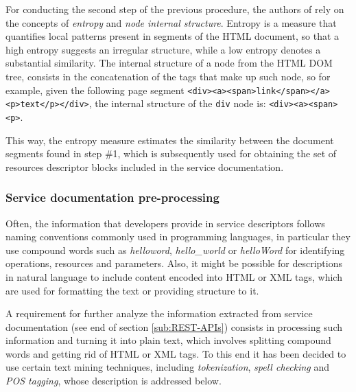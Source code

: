 For conducting the second step of the previous procedure, the authors of \cite{Ly:2012} rely on the concepts of \emph{entropy} and \emph{node internal structure}. Entropy is a measure that quantifies local patterns present in segments of the HTML document, so that a high entropy suggests
an irregular structure, while a low entropy denotes a substantial similarity. The internal structure of a node from the HTML DOM tree, consists in the concatenation of the tags that make up such node, so for example, given the following page segment \texttt{<div><a><span>link</span></a>\\<p>text</p></div>}, the internal structure of the \texttt{div} node is: \texttt{<div><a><span><p>}.

This way, the entropy measure estimates the similarity between the document segments found in step \#1, which is subsequently used for obtaining the set of resources descriptor blocks included in the service documentation.

\subsubsection{Service documentation pre-processing}
\label{subsub:Service-documentation-cleaning}
Often, the information that developers provide in service descriptors follows naming conventions commonly used in programming languages, in particular they use compound words such as \emph{helloword}, \emph{hello\_world} or \emph{helloWord} for identifying operations, resources and parameters. Also, it might be possible for descriptions in natural language to include content encoded into HTML or XML tags, which are used for formatting the text or providing structure to it. 

A requirement for further analyze the information extracted from service documentation (see end of section \ref{sub:REST-APIs}) consists in processing such information and turning it into plain text, which involves splitting compound words and getting rid of HTML or XML tags. To this end it has been decided to use certain text mining techniques, including \emph{tokenization}, \emph{spell checking }and \emph{POS tagging}, whose description is addressed below. 

